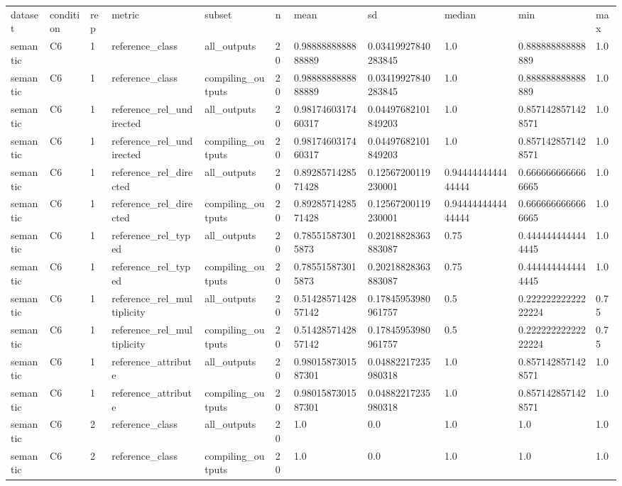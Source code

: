 \begin{tabular}{lllllllllll}
dataset & condition & rep & metric & subset & n & mean & sd & median & min & max \\
semantic & C6 & 1 & reference\_class & all\_outputs & 20 & 0.9888888888888889 & 0.03419927840283845 & 1.0 & 0.888888888888889 & 1.0 \\
semantic & C6 & 1 & reference\_class & compiling\_outputs & 20 & 0.9888888888888889 & 0.03419927840283845 & 1.0 & 0.888888888888889 & 1.0 \\
semantic & C6 & 1 & reference\_rel\_undirected & all\_outputs & 20 & 0.9817460317460317 & 0.04497682101849203 & 1.0 & 0.8571428571428571 & 1.0 \\
semantic & C6 & 1 & reference\_rel\_undirected & compiling\_outputs & 20 & 0.9817460317460317 & 0.04497682101849203 & 1.0 & 0.8571428571428571 & 1.0 \\
semantic & C6 & 1 & reference\_rel\_directed & all\_outputs & 20 & 0.8928571428571428 & 0.12567200119230001 & 0.9444444444444444 & 0.6666666666666665 & 1.0 \\
semantic & C6 & 1 & reference\_rel\_directed & compiling\_outputs & 20 & 0.8928571428571428 & 0.12567200119230001 & 0.9444444444444444 & 0.6666666666666665 & 1.0 \\
semantic & C6 & 1 & reference\_rel\_typed & all\_outputs & 20 & 0.785515873015873 & 0.20218828363883087 & 0.75 & 0.4444444444444445 & 1.0 \\
semantic & C6 & 1 & reference\_rel\_typed & compiling\_outputs & 20 & 0.785515873015873 & 0.20218828363883087 & 0.75 & 0.4444444444444445 & 1.0 \\
semantic & C6 & 1 & reference\_rel\_multiplicity & all\_outputs & 20 & 0.5142857142857142 & 0.17845953980961757 & 0.5 & 0.22222222222222224 & 0.75 \\
semantic & C6 & 1 & reference\_rel\_multiplicity & compiling\_outputs & 20 & 0.5142857142857142 & 0.17845953980961757 & 0.5 & 0.22222222222222224 & 0.75 \\
semantic & C6 & 1 & reference\_attribute & all\_outputs & 20 & 0.9801587301587301 & 0.04882217235980318 & 1.0 & 0.8571428571428571 & 1.0 \\
semantic & C6 & 1 & reference\_attribute & compiling\_outputs & 20 & 0.9801587301587301 & 0.04882217235980318 & 1.0 & 0.8571428571428571 & 1.0 \\
semantic & C6 & 2 & reference\_class & all\_outputs & 20 & 1.0 & 0.0 & 1.0 & 1.0 & 1.0 \\
semantic & C6 & 2 & reference\_class & compiling\_outputs & 20 & 1.0 & 0.0 & 1.0 & 1.0 & 1.0 \\

\end{tabular}
